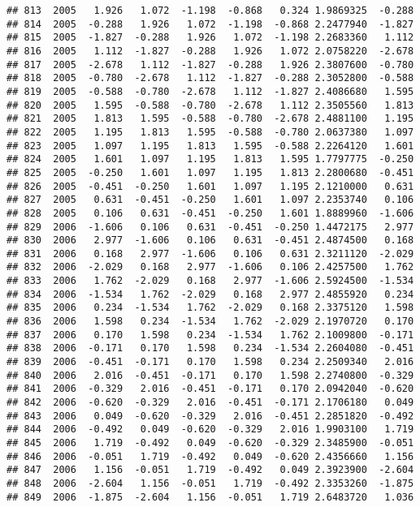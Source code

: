 \documentclass[]{article}
\begin{document}
\begin{verbatim}
## 813  2005   1.926   1.072  -1.198  -0.868   0.324 1.9869325  -0.288
## 814  2005  -0.288   1.926   1.072  -1.198  -0.868 2.2477940  -1.827
## 815  2005  -1.827  -0.288   1.926   1.072  -1.198 2.2683360   1.112
## 816  2005   1.112  -1.827  -0.288   1.926   1.072 2.0758220  -2.678
## 817  2005  -2.678   1.112  -1.827  -0.288   1.926 2.3807600  -0.780
## 818  2005  -0.780  -2.678   1.112  -1.827  -0.288 2.3052800  -0.588
## 819  2005  -0.588  -0.780  -2.678   1.112  -1.827 2.4086680   1.595
## 820  2005   1.595  -0.588  -0.780  -2.678   1.112 2.3505560   1.813
## 821  2005   1.813   1.595  -0.588  -0.780  -2.678 2.4881100   1.195
## 822  2005   1.195   1.813   1.595  -0.588  -0.780 2.0637380   1.097
## 823  2005   1.097   1.195   1.813   1.595  -0.588 2.2264120   1.601
## 824  2005   1.601   1.097   1.195   1.813   1.595 1.7797775  -0.250
## 825  2005  -0.250   1.601   1.097   1.195   1.813 2.2800680  -0.451
## 826  2005  -0.451  -0.250   1.601   1.097   1.195 2.1210000   0.631
## 827  2005   0.631  -0.451  -0.250   1.601   1.097 2.2353740   0.106
## 828  2005   0.106   0.631  -0.451  -0.250   1.601 1.8889960  -1.606
## 829  2006  -1.606   0.106   0.631  -0.451  -0.250 1.4472175   2.977
## 830  2006   2.977  -1.606   0.106   0.631  -0.451 2.4874500   0.168
## 831  2006   0.168   2.977  -1.606   0.106   0.631 2.3211120  -2.029
## 832  2006  -2.029   0.168   2.977  -1.606   0.106 2.4257500   1.762
## 833  2006   1.762  -2.029   0.168   2.977  -1.606 2.5924500  -1.534
## 834  2006  -1.534   1.762  -2.029   0.168   2.977 2.4855920   0.234
## 835  2006   0.234  -1.534   1.762  -2.029   0.168 2.3375120   1.598
## 836  2006   1.598   0.234  -1.534   1.762  -2.029 2.1970720   0.170
## 837  2006   0.170   1.598   0.234  -1.534   1.762 2.1009800  -0.171
## 838  2006  -0.171   0.170   1.598   0.234  -1.534 2.2604080  -0.451
## 839  2006  -0.451  -0.171   0.170   1.598   0.234 2.2509340   2.016
## 840  2006   2.016  -0.451  -0.171   0.170   1.598 2.2740800  -0.329
## 841  2006  -0.329   2.016  -0.451  -0.171   0.170 2.0942040  -0.620
## 842  2006  -0.620  -0.329   2.016  -0.451  -0.171 2.1706180   0.049
## 843  2006   0.049  -0.620  -0.329   2.016  -0.451 2.2851820  -0.492
## 844  2006  -0.492   0.049  -0.620  -0.329   2.016 1.9903100   1.719
## 845  2006   1.719  -0.492   0.049  -0.620  -0.329 2.3485900  -0.051
## 846  2006  -0.051   1.719  -0.492   0.049  -0.620 2.4356660   1.156
## 847  2006   1.156  -0.051   1.719  -0.492   0.049 2.3923900  -2.604
## 848  2006  -2.604   1.156  -0.051   1.719  -0.492 2.3353260  -1.875
## 849  2006  -1.875  -2.604   1.156  -0.051   1.719 2.6483720   1.036

\end{verbatim}
\end{document}
